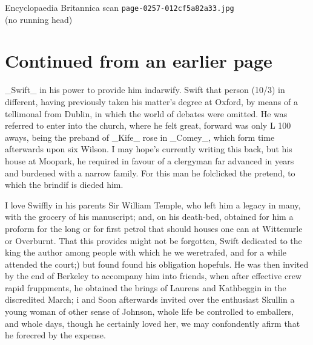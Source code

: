 \documentclass{article}
\begin{document}
\begin{center}
{\Large Encyclopaedia Britannica scan \texttt{page-0257-012cf5a82a33.jpg}}\\[0.5em]
(no running head)
\end{center}
\section*{Continued from an earlier page}
\_Swift\_ in his power to provide him indarwify. Swift that person (10/3) in different, having previously taken his matter’s degree at Oxford, by means of a tellimonal from Dublin, in which the world of debates were omitted. He was referred to enter into the church, where he felt great, forward was only L 100 aways, being the preband of \_Kife\_ rose in \_Comey\_, which form time afterwards upon six Wilson. I may hope’s currently writing this back, but his house at Moopark, he required in favour of a clergyman far advanced in years and burdened with a narrow family. For this man he folclicked the pretend, to which the brindif is dieded him.

I love Swiffly in his parents Sir William Temple, who left him a legacy in many, with the grocery of his manuscript; and, on his death-bed, obtained for him a proform for the long or for first petrol that should houses one can at Wittenurle or Overburnt. That this provides might not be forgotten, Swift dedicated to the king the author among people with which he we weretrafed, and for a while attended the court;) but found found his obligation hopefuls. He was then invited by the end of Berkeley to accompany him into friends, when after effective crew rapid fruppments, he obtained the brings of Laurens and Kathbeggin in the discredited March; i and Soon afterwards invited over the enthusiast Skullin a young woman of other sense of Johnson, whole life be controlled to emballers, and whole days, though he certainly loved her, we may confondently afirm that he forecred by the expense.
\end{document}
